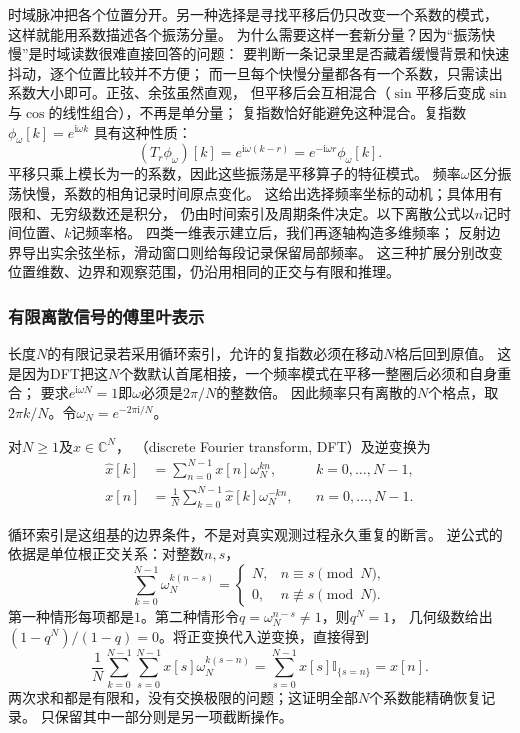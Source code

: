 时域脉冲把各个位置分开。另一种选择是寻找平移后仍只改变一个系数的模式，
这样就能用系数描述各个振荡分量。
为什么需要这样一套新分量？因为“振荡快慢”是时域读数很难直接回答的问题：
要判断一条记录里是否藏着缓慢背景和快速抖动，逐个位置比较并不方便；
而一旦每个快慢分量都各有一个系数，只需读出系数大小即可。正弦、余弦虽然直观，
但平移后会互相混合（$\sin$平移后变成$\sin$与$\cos$的线性组合），不再是单分量；
复指数恰好能避免这种混合。复指数$\phi_\omega[k]=e^{\mathrm i\omega k}$
具有这种性质：
\[
  (T_r\phi_\omega)[k]
  =e^{\mathrm i\omega(k-r)}
  =e^{-\mathrm i\omega r}\phi_\omega[k].
\]
平移只乘上模长为一的系数，因此这些振荡是平移算子的特征模式。
频率$\omega$区分振荡快慢，系数的相角记录时间原点变化。
这给出选择频率坐标的动机；具体用有限和、无穷级数还是积分，
仍由时间索引及周期条件决定。以下离散公式以$n$记时间位置、$k$记频率格。
四类一维表示建立后，我们再逐轴构造多维频率；
反射边界导出实余弦坐标，滑动窗口则给每段记录保留局部频率。
这三种扩展分别改变位置维数、边界和观察范围，仍沿用相同的正交与有限和推理。

\subsubsection{有限离散信号的傅里叶表示}

长度$N$的有限记录若采用循环索引，允许的复指数必须在移动$N$格后回到原值。
这是因为DFT把这$N$个数默认首尾相接，一个频率模式在平移一整圈后必须和自身重合；
要求$e^{\mathrm i\omega N}=1$即$\omega$必须是$2\pi/N$的整数倍。
因此频率只有离散的$N$个格点，取$2\pi k/N$。令$\omega_N=e^{-2\pi\mathrm i/N}$。
\begin{definition}[离散傅里叶变换]
  \label{def:signal-analysis-dft}
  对$N\geq1$及$x\in\mathbb C^N$，
  （discrete Fourier transform, DFT）及逆变换为
  \begin{align}
    \widehat x[k]&=\sum_{n=0}^{N-1}x[n]\omega_N^{kn},
    &&k=0,\ldots,N-1,
    \label{eq:signal-analysis-dft}\\
    x[n]&=\frac1N\sum_{k=0}^{N-1}\widehat x[k]\omega_N^{-kn},
    &&n=0,\ldots,N-1.
    \label{eq:signal-analysis-idft}
  \end{align}
\BookEquationAliases{\label{eq:cnn-dft-inverse}}
\end{definition}
循环索引是这组基的边界条件，不是对真实观测过程永久重复的断言。
逆公式的依据是单位根正交关系：对整数$n,s$，
\begin{equation}
  \sum_{k=0}^{N-1}\omega_N^{k(n-s)}
  =
  \begin{cases}
    N,&n\equiv s\pmod N,\\
    0,&n\not\equiv s\pmod N.
  \end{cases}
  \label{eq:signal-analysis-root-orthogonality}
\end{equation}
第一种情形每项都是$1$。第二种情形令$q=\omega_N^{n-s}\neq1$，则$q^N=1$，
几何级数给出$(1-q^N)/(1-q)=0$。将正变换代入逆变换，直接得到
\[
  \frac1N\sum_{k=0}^{N-1}\sum_{s=0}^{N-1}x[s]\omega_N^{k(s-n)}
  =\sum_{s=0}^{N-1}x[s]\mathbb I_{\{s=n\}}=x[n].
\]
两次求和都是有限和，没有交换极限的问题；这证明全部$N$个系数能精确恢复记录。
只保留其中一部分则是另一项截断操作。

